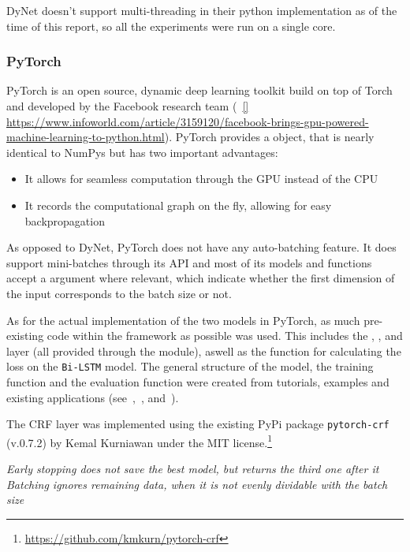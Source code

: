 DyNet doesn't support multi-threading in their python implementation as of the
time of this report, so all the experiments were run on a single core. 

\subsubsection*{PyTorch}

PyTorch is an open source, dynamic deep learning toolkit build on top of Torch
and developed by the Facebook research team (~\ref{}
\url{https://www.infoworld.com/article/3159120/facebook-brings-gpu-powered-machine-learning-to-python.html}).
PyTorch provides a  object, that is nearly identical to NumPys
 but has two important advantages:

\begin{itemize}
    \item It allows for seamless computation through the GPU instead of the CPU
    \item It records the computational graph on the fly, allowing for easy
        backpropagation
\end{itemize}

As opposed to DyNet, PyTorch does not have any auto-batching feature. It does
support mini-batches through its API and most of its models and functions accept
a  argument where relevant, which indicate whether the first
dimension of the input corresponds to the batch size or not.

As for the actual implementation of the two models in PyTorch, as much
pre-existing code within the framework as possible was used. This includes the
, ,  and  layer (all
provided through the  module), aswell as the
 function for calculating the loss on the
\texttt{Bi-LSTM} model. The general structure of the model, the training
function and the evaluation function were created from tutorials, examples and
existing applications (see~\cite{pytorch2017lstm},~\cite{yang2018ncrf},
and~\cite{pytorch2018examples}).

The CRF layer was implemented using the existing PyPi package
\texttt{pytorch-crf} (v.0.7.2) by Kemal Kurniawan under the MIT
license.\footnote{\url{https://github.com/kmkurn/pytorch-crf}}

\textit{Early stopping does not save the best model, but returns the third one
after it} \\
\textit{Batching ignores remaining data, when it is not evenly dividable with the
batch size}



